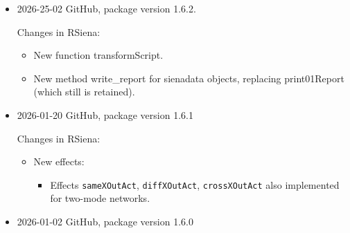 \documentclass[a4paper,fleqn,11pt]{article}
\newcommand{\+}{\, + \,}
\newcommand{\sfn}[1]{\textsf{#1}}
\begin{document}
\begin{small}
\begin{itemize}
\begin{itemize}
\begin{itemize}
  \item For \sfn{test\_gof},
    all arguments are transferred to the call of \sfn{sienaGOF}.
  \item For \sfn{interpret\_selection},
    all arguments are transferred to the call of \sfn{selectionTable}.
  \item For \sfn{interpret\_influence},
    all arguments are transferred to the call of \sfn{influenceTable}.
    \end{itemize}
\item Documentation:
   \begin{itemize}
  \item Manual updated to new function names and use of \sfn{autograph} for
    plotting influence and selection tables.
  \item In help file for \sfn{set\_interaction}, treatment of \texttt{shortNames}
    corrected.
  \item In help file for \sfn{set\_effect}, treatment of \texttt{covar1} and \texttt{covar2}
    corrected.
    \end{itemize}
\end{itemize}

\item 2026-25-02 GitHub, package version 1.6.2.

Changes in RSiena:
\begin{itemize}
\item New function \sfn{transformScript}.
\item New method \sfn{write\_report} for \sfn{sienadata} objects,
    replacing \sfn{print01Report} (which still is retained).
\end{itemize}

\item 2026-01-20 GitHub, package version 1.6.1

Changes in RSiena:
\begin{itemize}
\item New effects:
   \begin{itemize}
   \item Effects \texttt{sameXOutAct}, \texttt{diffXOutAct}, \texttt{crossXOutAct} also implemented for two-mode networks.
    \end{itemize}
\end{itemize}

\item 2026-01-02 GitHub, package version 1.6.0


\end{itemize}
\end{small}
\end{document}
